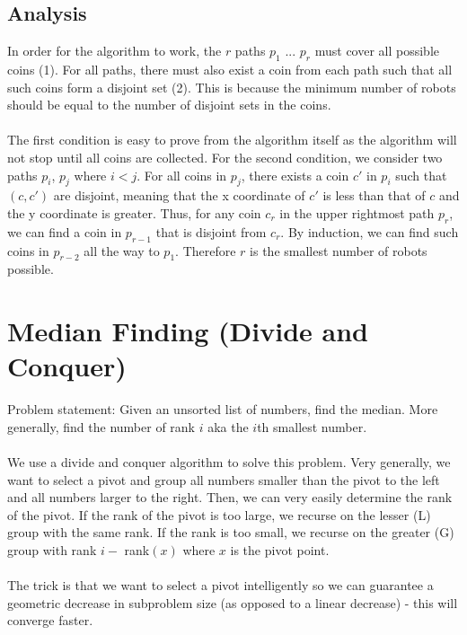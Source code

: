 \documentclass{article}
\begin{document}
\subsection*{Analysis}
In order for the algorithm to work, the $r$ paths $p_1$ ... $p_r$ must cover all possible coins (1). For all paths, there must also exist a coin from each path such that all such coins form a disjoint set (2). This is because the minimum number of robots should be equal to the number of disjoint sets in the coins.
\\
\\
The first condition is easy to prove from the algorithm itself as the algorithm will not stop until all coins are collected. For the second condition, we consider two paths $p_i$, $p_j$ where $i < j$. For all coins in $p_j$, there exists a coin $c'$ in $p_i$ such that $(c, c')$ are disjoint, meaning that the x coordinate of $c'$ is less than that of $c$ and the y coordinate is greater. Thus, for any coin $c_r$ in the upper rightmost path $p_r$, we can find a coin in $p_{r-1}$ that is disjoint from $c_r$. By induction, we can find such coins in $p_{r-2}$ all the way to $p_1$. Therefore $r$ is the smallest number of robots possible. 
\newpage
\section{Median Finding (Divide and Conquer)}
Problem statement: Given an unsorted list of numbers, find the median. More generally, find the number of rank $i$ aka the $i$th smallest number.
\\
\\
We use a divide and conquer algorithm to solve this problem. Very generally, we want to select a pivot and group all numbers smaller than the pivot to the left and all numbers larger to the right. Then, we can very easily determine the rank of the pivot. If the rank of the pivot is too large, we recurse on the lesser (L) group with the same rank. If the rank is too small, we recurse on the greater (G) group with rank $i -$ rank$(x)$ where $x$ is the pivot point.
\\
\\
The trick is that we want to select a pivot intelligently so we can guarantee a geometric decrease in subproblem size (as opposed to a linear decrease) - this will converge faster.
\end{document}
